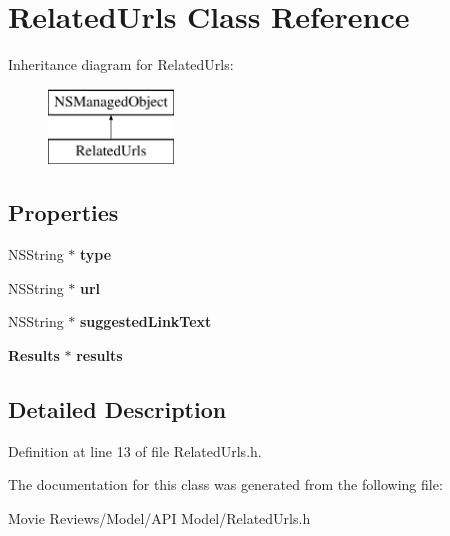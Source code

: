 \section{Related\+Urls Class Reference}
\label{interface_related_urls}
Inheritance diagram for Related\+Urls\+:\begin{figure}[H]
\begin{center}
\leavevmode
\includegraphics[height=2.000000cm]{interface_related_urls}
\end{center}
\end{figure}
\subsection*{Properties}
\begin{DoxyCompactItemize}
\item 
N\+S\+String $\ast$ {\bfseries type}\label{interface_related_urls_aca771de7ffa5fe0c158e46c523ed2f7a}

\item 
N\+S\+String $\ast$ {\bfseries url}\label{interface_related_urls_a2cc75a6e94f595fb316c6997f359375d}

\item 
N\+S\+String $\ast$ {\bfseries suggested\+Link\+Text}\label{interface_related_urls_a62b57fc453eafac0439f7379e0fa5284}

\item 
{\bf Results} $\ast$ {\bfseries results}\label{interface_related_urls_ae7f99746cb19cc654137d2e301be10d1}

\end{DoxyCompactItemize}


\subsection{Detailed Description}


Definition at line 13 of file Related\+Urls.\+h.



The documentation for this class was generated from the following file\+:\begin{DoxyCompactItemize}
\item 
Movie Reviews/\+Model/\+A\+P\+I Model/Related\+Urls.\+h\end{DoxyCompactItemize}
